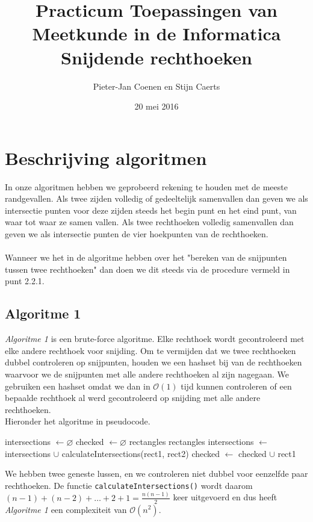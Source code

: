 \documentclass[11pt,a4paper,titlepage]{article}
\author{Pieter-Jan Coenen en Stijn Caerts}
\title{Practicum Toepassingen van Meetkunde in de Informatica \\ Snijdende rechthoeken}
\date{20 mei 2016}
\begin{document}
	\maketitle
	\tableofcontents
	\newpage
	\section{Beschrijving algoritmen}
	In onze algoritmen hebben we geprobeerd rekening te houden met de meeste randgevallen. Als twee zijden volledig of gedeeltelijk samenvallen dan geven we als intersectie punten voor deze zijden steeds het begin punt en het eind punt, van waar tot waar ze samen vallen.  Als twee rechthoeken volledig samenvallen dan geven we als intersectie punten de vier hoekpunten van de rechthoeken.\\ \\
	Wanneer we het in de algoritme hebben over het "bereken van de snijpunten tussen twee rechthoeken" dan doen we dit steeds via de procedure vermeld in punt 2.2.1.
	\subsection{Algoritme 1}
	\emph{Algoritme 1} is een brute-force algoritme. Elke rechthoek wordt gecontroleerd met elke andere rechthoek voor snijding. Om te vermijden dat we twee rechthoeken dubbel controleren op snijpunten, houden we een hashset bij van de rechthoeken waarvoor we de snijpunten met alle andere rechthoeken al zijn nagegaan. We gebruiken een hashset omdat we dan in  $\mathcal{O}(1)$ tijd kunnen controleren of een bepaalde rechthoek al werd gecontroleerd op snijding met alle andere rechthoeken.\\ Hieronder het algoritme in pseudocode.
	\begin{algorithm}[H]
		\caption{}
		\begin{algorithmic}[1]
			\State intersections $\gets \varnothing $
			\State checked $\gets \varnothing $
			 {rectangles}
				 {rectangles}
						\State intersections $ \gets $ intersections $ \cup $ calculateIntersections(rect1, rect2)
					\EndIf
				\EndForEach
				\State checked $\gets$ checked $\cup$ rect1
			\EndForEach
		\end{algorithmic}
	\end{algorithm}
	We hebben twee geneste lussen, en we controleren niet dubbel voor eenzelfde paar rechthoeken. De functie \texttt{calculateIntersections()} wordt daarom $ (n-1) + (n-2) + \dots + 2 + 1 = \frac{n(n-1)}{2} $ keer uitgevoerd en dus heeft \emph{Algoritme 1} een complexiteit van $\mathcal{O}(n^2)$.
	
\end{document}
